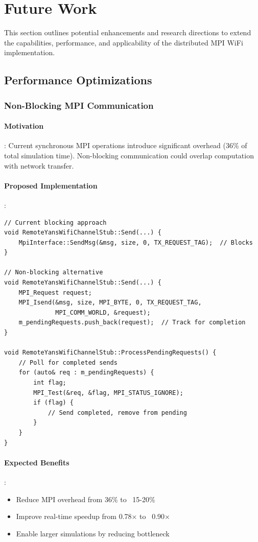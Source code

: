 \section{Future Work}
\label{sec:future-work}

This section outlines potential enhancements and research directions to extend the capabilities, performance, and applicability of the distributed MPI WiFi implementation.

\subsection{Performance Optimizations}

\subsubsection{Non-Blocking MPI Communication}

\paragraph{Motivation}:
Current synchronous MPI operations introduce significant overhead (36\% of total simulation time). Non-blocking communication could overlap computation with network transfer.

\paragraph{Proposed Implementation}:
\begin{lstlisting}[style=cpp]
// Current blocking approach
void RemoteYansWifiChannelStub::Send(...) {
    MpiInterface::SendMsg(&msg, size, 0, TX_REQUEST_TAG);  // Blocks
}

// Non-blocking alternative
void RemoteYansWifiChannelStub::Send(...) {
    MPI_Request request;
    MPI_Isend(&msg, size, MPI_BYTE, 0, TX_REQUEST_TAG, 
              MPI_COMM_WORLD, &request);
    m_pendingRequests.push_back(request);  // Track for completion
}

void RemoteYansWifiChannelStub::ProcessPendingRequests() {
    // Poll for completed sends
    for (auto& req : m_pendingRequests) {
        int flag;
        MPI_Test(&req, &flag, MPI_STATUS_IGNORE);
        if (flag) {
            // Send completed, remove from pending
        }
    }
}
\end{lstlisting}

\paragraph{Expected Benefits}:
\begin{itemize}
    \item Reduce MPI overhead from 36\% to ~15-20\%
    \item Improve real-time speedup from 0.78× to ~0.90×
    \item Enable larger simulations by reducing bottleneck
\end{itemize}

